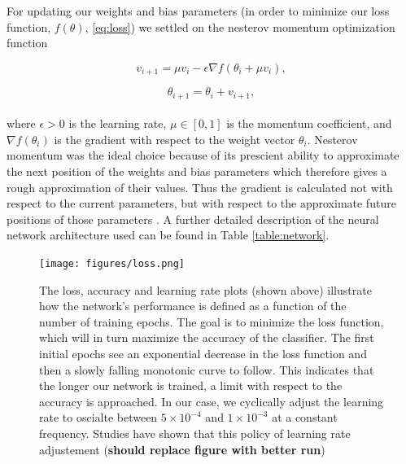 \documentclass[%
 amsmath,amssymb,
 aps,
 twocolumn,
 prl,
 reprint,
floatfix,
]{revtex4-1}
\begin{document}
For updating our weights and bias parameters (in order to minimize our loss function, $f(\theta)$, \eqref{eq:loss}) we settled on the nesterov momentum optimization function

\begin{equation} \label{eq:nesterov1}
v_{i+1} = \mu v_{i} - \epsilon \nabla f(\theta_{i} + \mu v_{i}),
\end{equation}

\begin{equation} \label{eq:nesterov2}
\theta_{i+1} = \theta_{i} + v_{i+1},
\end{equation} \\

where $\epsilon > 0$ is the learning rate, $\mu \in [0,1]$ is the momentum coefficient, and $\nabla f(\theta_{i})$ is the gradient with respect to the weight vector $\theta_{i}$. Nesterov momentum was the ideal choice because of its prescient ability to approximate the next position of the weights and bias parameters which therefore gives a rough approximation of their values. Thus the gradient is calculated not with respect to the current parameters, but with respect to the approximate future positions of those parameters \cite{Sutskever:2013:IIM:3042817.3043064}. A further detailed description of the neural network architecture used can be found in Table \ref{table:network}.

\begin{figure}[!h]
 \texttt{[image: figures/loss.png]}
 \caption{\label{fig:loss_curve} The loss, accuracy and learning rate plots (shown above) illustrate how the network's performance is defined as a function of the number of training epochs. The goal is to minimize the loss function, which will in turn maximize the accuracy of the classifier. The first initial epochs see an exponential decrease in the loss function and then a slowly falling monotonic curve to follow. This indicates that the longer our network is trained, a limit with respect to the accuracy is approached. In our case, we cyclically adjust the learning rate to oscialte between $5 \times 10^{-4}$ and $1 \times 10^{-3}$ at a constant frequency. Studies have shown that this policy of learning rate adjustement (\textbf{should replace figure with better run})
}
\end{figure}
\end{document}
